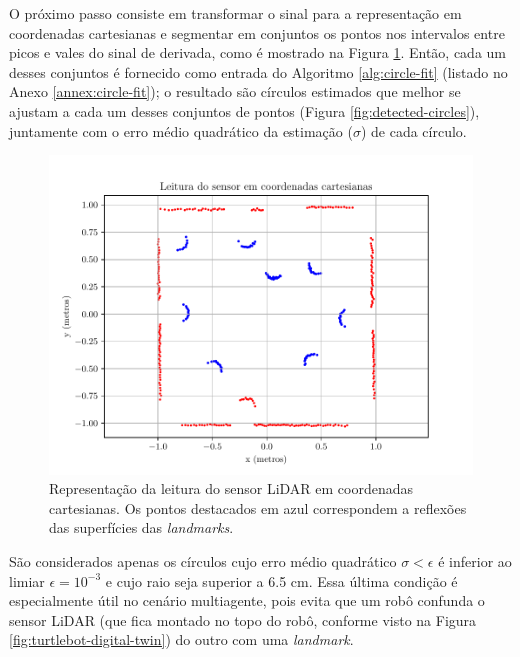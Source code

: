 O próximo passo consiste em transformar o sinal para a representação em 
coordenadas cartesianas e segmentar em conjuntos os pontos nos intervalos entre picos e vales do sinal de derivada, como é mostrado na Figura \ref{fig:sensor-data-cartesian}.
Então, cada um desses conjuntos é fornecido como entrada do Algoritmo 
\ref{alg:circle-fit} (listado no Anexo \ref{annex:circle-fit}); o resultado 
são círculos estimados que melhor se ajustam a cada um desses conjuntos de pontos (Figura \ref{fig:detected-circles}), juntamente com o 
erro médio quadrático da estimação ($\sigma$) de cada círculo.
\begin{figure}[]
  \centering
  \includegraphics[width=.8\textwidth]{figs/sensor_data_cartesian.pdf}
  \caption[Segmentação dos feixes refletidos pelas superfícies cilíndricas dos \textit{landmarks}]{Representação da leitura do sensor LiDAR em coordenadas 
  cartesianas. Os pontos destacados em azul correspondem a reflexões 
  das superfícies das \textit{landmarks}.}
  \label{fig:sensor-data-cartesian}
\end{figure}

São considerados apenas os círculos cujo erro médio quadrático $\sigma < \epsilon$ é inferior ao limiar $\epsilon = 10^{-3}$ e 
cujo raio seja superior a 6.5 cm. Essa última condição é especialmente útil no 
cenário multiagente, pois evita que um robô confunda o sensor LiDAR (que 
fica montado no topo do robô, conforme visto na Figura \ref{fig:turtlebot-digital-twin}) do outro com uma \textit{landmark}.

